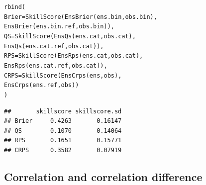 \documentclass[10pt]{article}\usepackage[]{graphicx}\usepackage[]{color}
\makeatletter
\newcommand{\hlstd}[1]{\textcolor[rgb]{0,0,0}{#1}}%
\newcommand{\hlkwc}[1]{\textcolor[rgb]{0,0.502,0.753}{#1}}%
\newcommand{\hlkwd}[1]{\textcolor[rgb]{0,0.267,0.4}{#1}}%
\newenvironment{kframe}{%
 \def\at@end@of@kframe{}%
 \ifinner\ifhmode%
  \def\at@end@of@kframe{\end{minipage}}%
  \begin{minipage}{\columnwidth}%
 \fi\fi%
 \def\FrameCommand##1{\hskip\@totalleftmargin \hskip-\fboxsep
 \colorbox{shadecolor}{##1}\hskip-\fboxsep
     \hskip-\linewidth \hskip-\@totalleftmargin \hskip\columnwidth}%
 \MakeFramed {\advance\hsize-\width
   \@totalleftmargin\z@ \linewidth\hsize
   \@setminipage}}%
 {\par\unskip\endMakeFramed%
 \at@end@of@kframe}
\newenvironment{knitrout}{}{} %
\makeatother
\begin{document}
\begin{knitrout}
\color{fgcolor}\begin{kframe}
\begin{alltt}
\hlkwd{rbind}\hlstd{(}
 \hlkwc{Brier} \hlstd{=} \hlkwd{SkillScore}\hlstd{(}\hlkwd{EnsBrier}\hlstd{(ens.bin, obs.bin),}
                    \hlkwd{EnsBrier}\hlstd{(ens.bin.ref, obs.bin)),}
 \hlkwc{QS}    \hlstd{=} \hlkwd{SkillScore}\hlstd{(}\hlkwd{EnsQs}\hlstd{(ens.cat, obs.cat),}
                    \hlkwd{EnsQs}\hlstd{(ens.cat.ref, obs.cat)),}
 \hlkwc{RPS}   \hlstd{=} \hlkwd{SkillScore}\hlstd{(}\hlkwd{EnsRps}\hlstd{(ens.cat, obs.cat),}
                    \hlkwd{EnsRps}\hlstd{(ens.cat.ref, obs.cat)),}
 \hlkwc{CRPS}  \hlstd{=} \hlkwd{SkillScore}\hlstd{(}\hlkwd{EnsCrps}\hlstd{(ens, obs),}
                    \hlkwd{EnsCrps}\hlstd{(ens.ref, obs))}
\hlstd{)}
\end{alltt}
\begin{verbatim}
##       skillscore skillscore.sd
## Brier     0.4263       0.16147
## QS        0.1070       0.14064
## RPS       0.1651       0.15771
## CRPS      0.3582       0.07919
\end{verbatim}
\end{kframe}
\end{knitrout}


\subsection{Correlation and correlation difference}
\end{document}
